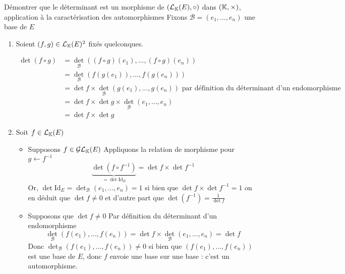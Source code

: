 \documentclass{article}
\renewenvironment{question_kholle}[2][ ]
{
	\subsection{\texorpdfstring{#2}{}}
	\notblank{#1}
	{
		\noindent #1
		\bigbreak
	}
	{}
	\begin{proof}
}
{
	\end{proof}
}
\begin{document}
\begin{question_kholle}
    [{\begin{enumerate}
        \item $\forall (f, g) \in \mathcal{L}_{\K}(E)^{2}, \det (f \circ g) = \det f \times \det g$
        
        \item $\forall f \in \mathcal{L}_{K}(E), f \in \mathcal{GL}_{\K}(E) \iff \det f \neq 0$
    \end{enumerate}
    }]{Démontrer que le déterminant est un morphisme de $(\mathcal{L}_{\mathbb K}(E), \circ)$ dans $(\mathbb K, \times)$, application à la caractérisation des automorphismes}
    Fixons $\mathcal{B}=(e_{1}, \dots, e_{n})$ une base de $E$
    \begin{enumerate} 
        \item Soient $(f, g) \in \mathcal{L}_{\mathbb K}(E)^{2}$ fixés quelconques.
        
        \begin{align*}
            \det (f \circ  g) &= \det_{\mathcal{B}}((f \circ g)(e_{1}), \dots, (f \circ  g)(e_{n})) \\
            &= \det_{\mathcal{B}}(f(g(e_{1})), \dots, f(g(e_{n}))) \\
            &= \det f \times \det_{\mathcal{B}}(g(e_{1}), \dots, g(e_{n})) \text{ par définition du déterminant d'un endomorphisme} \\
            &= \det f \times \det g \times \det_{\mathcal{B}}(e_{1}, \dots, e_{n}) \\
            &= \det f \times \det g
        \end{align*}
        
        
        
        \item Soit $f \in \mathcal{L}_{\mathbb K}(E)$
        \begin{itemize}
            \item Supposons $f \in \mathcal{GL}_{\mathbb K}(E)$
            Appliquons la relation de morphisme pour $g \leftarrow f^{-1}$
$$
            \underbrace{ \det(f \circ  f^{-1}) }_{ = \det \mathrm{Id}_{E} } = \det f \times \det f^{-1}
$$
            Or, $\det \mathrm{Id}_{E}= \det_{\mathcal{B}}(e_{1}, \dots, e_{n}) = 1$ si bien que $\det f \times \det f^{-1} = 1$ on en déduit que $\det f \neq 0$ et d'autre part que $\det (f^{-1}) = \frac{1}{\det f}$
            \item Supposons que $\det f \neq 0$
            Par définition du déterminant d'un endomorphisme
$$
            \det_{\mathcal{B}}(f(e_{1}), \dots, f(e_{n})) = \det f \times \det_{\mathcal{B}}(e_{1}, \dots, e_{n}) = \det f
$$
            Donc $\det_{\mathcal{B}}(f(e_{1}), \dots, f(e_{n})) \neq 0$ si bien que $(f(e_{1}), \dots, f(e_{n}))$ est une base de $E$, donc $f$ envoie une base sur une base : c'est un automorphisme.
        \end{itemize}
    \end{enumerate}
\end{question_kholle}
\end{document}
